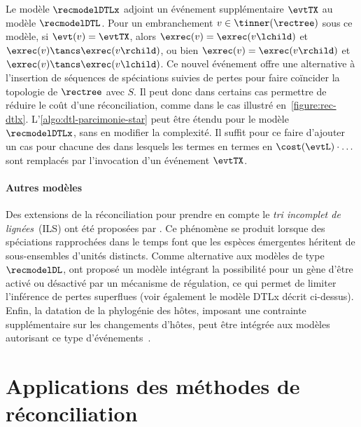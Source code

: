 {Le modèle \(\recmodelDTLx\) adjoint un événement supplémentaire \(\evtTX\) au modèle \(\recmodelDTL\).
Pour un embranchement \(v \in \tinner(\rectree)\) sous ce modèle, si \(\evt(v) = \evtTX\), alors \(\exrec(v) = \exrec(v\lchild)\) et \(\exrec(v) \tancs \exrec(v\rchild)\), ou bien \(\exrec(v) = \exrec(v\rchild)\) et \(\exrec(v) \tancs \exrec(v\lchild)\).
Ce nouvel événement offre une alternative à l’insertion de séquences de spéciations suivies de pertes pour faire coïncider la topologie de \(\rectree\) avec \(S\).
Il peut donc dans certains cas permettre de réduire le coût d’une réconciliation, comme dans le cas illustré en~\cref{figure:rec-dtlx}.
L’\cref{algo:dtl-parcimonie-star} peut être étendu pour le modèle \(\recmodelDTLx\), sans en modifier la complexité.
Il suffit pour ce faire d’ajouter un cas pour chacune des  dans lesquels les termes en termes en \(\cost(\evtL) \cdot \hdots\) sont remplacés par l’invocation d’un événement \(\evtTX\).

\paragraph{Autres modèles}
Des extensions de la réconciliation pour prendre en compte le \emph{tri incomplet de lignées}~(ILS) ont été proposées par \textcite{Rasmussen2012UnifiedModelingGene,Wu2013MostParsimoniousReconciliation,Chan2017InferringIncompleteLineage}.
Ce phénomène se produit lorsque des spéciations rapprochées dans le temps font que les espèces émergentes héritent de sous-ensembles d’unités distincts.
Comme alternative aux modèles de type \(\recmodelDL\), \textcite{Goodman1979FittingGeneLineage} ont proposé un modèle intégrant la possibilité pour un gène d’être activé ou désactivé par un mécanisme de régulation, ce qui permet de limiter l’inférence de pertes superflues (voir également le modèle DTLx décrit ci-dessus).
Enfin, la datation de la phylogénie des hôtes, imposant une contrainte supplémentaire sur les changements d’hôtes, peut être intégrée aux modèles autorisant ce type d’événements~\parencite{Tofigh2011SimultaneousIdentificationDuplications}.

\section{Applications des méthodes de réconciliation}

}
